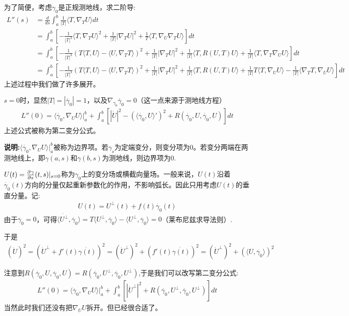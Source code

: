 为了简便，考虑$\gamma_0$是正规测地线，求二阶导:
\begin{align*}
    L''(s)&=\frac{d}{ds}\int_a^b \frac{1}{|T|}\langle T,\nabla_T U \rangle dt\\&=\int_a^b [-\frac{1}{|T|^3}\langle T,\nabla_T U\rangle^2+\frac{1}{|T|}|\nabla_T U|^2+\frac{1}{T}\langle T,\nabla_U \nabla_T U\rangle]dt\\&=\int_a^b [-\frac{1}{|T|^3}(T\langle T,U\rangle-\langle U,\nabla_T T\rangle)^2+\frac{1}{|T|}|\nabla_T U|^2+\frac{1}{|T|}\langle T,R(U,T)U\rangle+\frac{1}{|T|}\langle T,\nabla_T \nabla_U U\rangle]dt\\&=\int_a^b [-\frac{1}{|T|^3}(T\langle T,U\rangle-\langle U,\nabla_T T\rangle)^2+\frac{1}{|T|}|\nabla_T U|^2+\frac{1}{|T|}\langle T,R(U,T)U\rangle+\frac{1}{|T|}T\langle T, \nabla_U U\rangle-\frac{1}{|T|}\langle \nabla_T T,\nabla_U U \rangle]dt
\end{align*}
上述过程中我们做了许多展开。

$s=0$时，显然$|T|=|\dot{\gamma_0}|=1$，以及$\nabla_{\dot{\gamma_0}}\dot{\gamma_0}=0$（这一点来源于测地线方程）
\begin{align*}
    L''(0)=\langle \dot{\gamma_0},\nabla_U U\rangle|_a^b +\int_a^b [|\dot{U}|^2-(\langle \dot{\gamma_0},U\rangle')^2+R(\dot{\gamma_0},U,\dot{\gamma_0},U)]dt
\end{align*}
上述公式被称为第二变分公式。

\textbf{说明:}$\langle \dot{\gamma_0}, \nabla_U U\rangle|_a^b$被称为边界项。若$\gamma_s$为定端变分，则变分项为$0$。若变分两端在两测地线上，即$\gamma(a,s)$和$\gamma(b,s)$为测地线，则边界项为$0$.

$U(t)=\frac{\partial^{} \gamma}{\partial {s}^{}}(t,s)|_{s=0}$称为$\gamma_0$上的变分场或横截向量场。一般来说，$U(t)$沿着$\dot{\gamma_0}(t)$方向的分量仅起重新参数化的作用，不影响弧长。因此只用考虑$U(t)$的垂直分量。记:
\begin{align*}
    U(t)=U^{\perp}(t)+f(t)\dot{\gamma_0}(t)
\end{align*}
由于$\ddot{\gamma_0}=0$，可得$\langle \dot{U^{\bot}},\dot{\gamma_0}\rangle =T\langle U^{\bot},\dot{\gamma_0}\rangle-\langle U^{\bot},\ddot{\gamma_0}\rangle=0$（莱布尼兹求导法则）.

于是
\begin{align*}
(\dot{U})^2=(\dot{U}^{\bot}+f'(t)\dot{\gamma(t)})^2=(\dot{U}^{\bot})^2+(f'(t)\dot{\gamma(t)})^2=(\dot{U}^{\bot})^2+(\langle U,\dot{\gamma_0}\rangle)^2
\end{align*}

注意到$R(\dot{\gamma_0},U,\dot{\gamma_0},U)=R(\dot{\gamma_0},U^{\bot},\dot{\gamma_0},U^{\bot})$,于是我们可以改写第二变分公式:
\begin{align*}
     L''(0)=\langle \dot{\gamma_0},\nabla_U U\rangle|_a^b +\int_a^b [|\dot{U}^{\bot}|^2+R(\dot{\gamma_0},U^{\bot},\dot{\gamma_0},U^{\bot})]dt
\end{align*}
当然此时我们还没有把$\nabla_U U$拆开。但已经很合适了。


